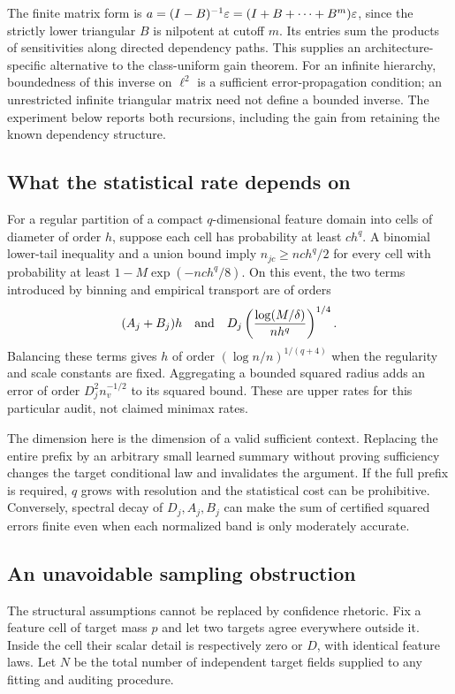 The finite matrix form is $a=(I-B)^{-1}\varepsilon=(I+B+\cdots+B^m)\varepsilon$, since the strictly lower triangular $B$ is nilpotent at cutoff $m$. Its entries sum the products of sensitivities along directed dependency paths. This supplies an architecture-specific alternative to the class-uniform gain theorem. For an infinite hierarchy, boundedness of this inverse on $\ell^2$ is a sufficient error-propagation condition; an unrestricted infinite triangular matrix need not define a bounded inverse. The experiment below reports both recursions, including the gain from retaining the known dependency structure.

\subsection{What the statistical rate depends on}
For a regular partition of a compact $q$-dimensional feature domain into cells of diameter of order $h$, suppose each cell has probability at least $c h^q$. A binomial lower-tail inequality and a union bound imply $n_{jc}\ge n c h^q/2$ for every cell with probability at least $1-M\exp(-nch^q/8)$. On this event, the two terms introduced by binning and empirical transport are of orders
\begin{equation}\label{eq:bin-rate}
 (A_j+B_j)h
 \quad\hbox{and}\quad
 D_j\left(\frac{\log(M/\delta)}{nh^q}\right)^{1/4}.
\end{equation}
Balancing these terms gives $h$ of order $(\log n/n)^{1/(q+4)}$ when the regularity and scale constants are fixed. Aggregating a bounded squared radius adds an error of order $D_j^2n_v^{-1/2}$ to its squared bound. These are upper rates for this particular audit, not claimed minimax rates.

The dimension here is the dimension of a valid sufficient context. Replacing the entire prefix by an arbitrary small learned summary without proving sufficiency changes the target conditional law and invalidates the argument. If the full prefix is required, $q$ grows with resolution and the statistical cost can be prohibitive. Conversely, spectral decay of $D_j,A_j,B_j$ can make the sum of certified squared errors finite even when each normalized band is only moderately accurate.

\subsection{An unavoidable sampling obstruction}
The structural assumptions cannot be replaced by confidence rhetoric. Fix a feature cell of target mass $p$ and let two targets agree everywhere outside it. Inside the cell their scalar detail is respectively zero or $D$, with identical feature laws. Let $N$ be the total number of independent target fields supplied to any fitting and auditing procedure.

